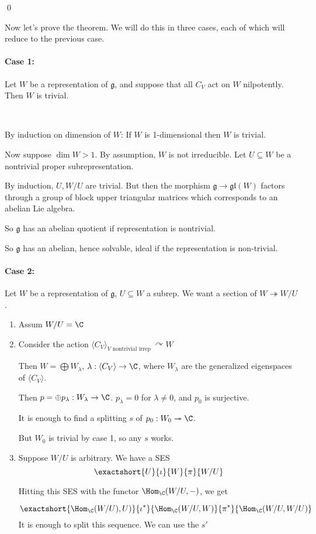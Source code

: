 \documentclass[x11names,reqno,14pt]{extarticle}
\newcommand{\mk}[1]{\mathfrak{#1}}
\newcommand{\g}{\mk{g}}
\newcommand{\onto}{\twoheadrightarrow}
\newcommand{\gl}{\mk{g}\mk{l}}
\begin{document}
\qed

\proof

Now let's prove the theorem. We will do this in three cases, each of which will reduce to the previous case. 

\paragraph{Case 1:} Let $W$ be a representation of $\g$, and suppose that all $C_V$ act on $W$ nilpotently. Then $W$ is trivial. 

\proof
\,

By induction on dimension of $W$: If $W$ is 1-dimensional then $W$ is trivial. 

Now suppose $\dim W > 1$. By assumption, $W$ is not irreducible. Let $U \subseteq W$ be a nontrivial proper subrepresentation. 

By induction, $U, W/U$ are trivial. But then the morphism $\g\to\gl(W)$ factors through a group of block upper triangular matrices which corresponds to an abelian Lie algebra.

So $\g$ has an abelian quotient if representation is nontrivial. 

So $\g$ has an abelian, hence solvable, ideal if the representation is non-trivial.  

\paragraph{Case 2:} 

Let $W$ be a representation of $\g$, $U \subseteq W$ a subrep. We want a section of $W\onto W/U$. 
\begin{enumerate}[label=(\roman*)]

\item Assum $W/U = \C$

\item Consider the action $\langle C_V \rangle_{V\text{ nontrivial irrep }}\curvearrowright W$

Then $W = \bigoplus W_\lambda$, $\lambda:\langle C_V\rangle \to \C$, where $W_\lambda$ are the generalized eigenspaces of $\langle C_V \rangle$. 

Then $p = \oplus p_\lambda:W_\lambda\to\C$. $p_\lambda = 0$ for $\lambda\neq 0$, and $p_0$ is surjective. 

It is enough to find a splitting $s$ of $p_0:W_0\onto\C$. 

But $W_0$ is trivial by case 1, so any $s$ works. 

\item Suppose $W/U$ is arbitrary. We have a SES
\[
\exactshort{U}{\iota}{W}{\pi}{W/U}
\]

Hitting this SES with the functor $\Hom_\C(W/U,-)$, we get 

\[
\exactshort{\Hom_\C(W/U),U)}{\iota^*}{\Hom_\C(W/U,W)}{\pi^*}{\Hom_\C(W/U,W/U)}
\]
It is enough to split this sequence. We can use the $s'$ 

\end{enumerate}
\end{document}
